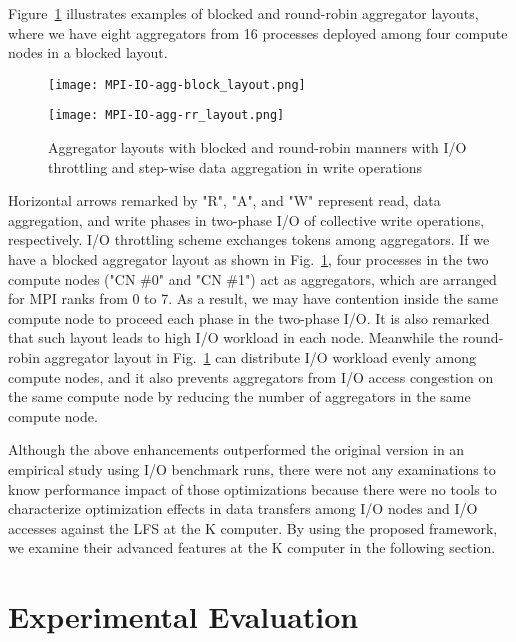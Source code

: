 \documentclass{jhps}
\begin{document}
Figure~\ref{fig:AGG_RR_LAYOUT} illustrates examples of blocked and round-robin
aggregator layouts, where we have eight aggregators from 16 processes
deployed among four compute nodes in a blocked layout.
%
\begin{figure}[htb]
\centering
\begin{minipage}[t]{0.36\textwidth}
\centering
\texttt{[image: MPI-IO-agg-block\_layout.png]}
\label{fig:BLK_LAYOUT}
\end{minipage}
\noindent
\begin{minipage}[t]{0.36\textwidth}
\centering
\texttt{[image: MPI-IO-agg-rr\_layout.png]}
\label{fig:RR_LAYOUT}
\end{minipage}
\caption{Aggregator layouts with blocked and round-robin manners with
I/O throttling and step-wise data aggregation in write operations}
\label{fig:AGG_RR_LAYOUT}
\end{figure}
%
Horizontal arrows remarked by "R", "A", and "W" represent
read, data aggregation, and write phases in two-phase I/O of collective write
operations, respectively.
I/O throttling scheme exchanges tokens among aggregators.
If we have a blocked aggregator layout as shown in
Fig.~\ref{fig:AGG_RR_LAYOUT},
four processes in the two compute nodes ("CN \#0" and "CN \#1")
act as aggregators, which are arranged for MPI ranks from 0 to 7.
As a result, we may have contention inside the same compute node
to proceed each phase in the two-phase I/O.
It is also remarked that such layout leads to high I/O workload
in each node.
Meanwhile the round-robin aggregator layout in
Fig.~\ref{fig:AGG_RR_LAYOUT}
can distribute I/O workload evenly
among compute nodes, and it also prevents aggregators
from I/O access congestion on the same compute node
by reducing the number of aggregators in the same compute node.

Although the above enhancements outperformed the original version
in an empirical study using I/O benchmark runs, there were not any examinations
to know performance impact of those optimizations because there were no tools
to characterize optimization effects in data transfers among I/O nodes and
I/O accesses against the LFS at the K computer.
By using the proposed framework, we examine their advanced features at the K computer
in the following section.

\section{Experimental Evaluation}
\label{sec:EVAL}
\end{document}
